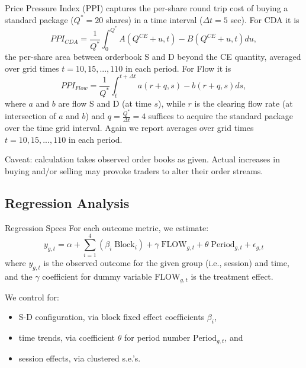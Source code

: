 \documentclass[10pt]{beamer}
\begin{document}
\begin{frame}{Price Pressure Index (PPI)}
captures the per-share round trip  cost of buying a standard package ($Q^*=20$ shares) in a time interval ($\Delta t = 5$ sec). %
For CDA it is
\begin{equation} \label{eq:ppicda}
    PPI_{CDA} = \frac{1}{Q^*}\int_0^{Q^*} A(Q^{CE}+u,t) - B(Q^{CE}+u,t) du,
\end{equation}
the per-share area between orderbook S and D beyond the CE quantity, averaged over grid times $t=10, 15, ... , 110$ in each period. %
For Flow it is
\begin{equation} \label{eq:ppiflow}
    PPI_{Flow} = \frac{1}{Q^*}\int_t^{t+\Delta t} a(r+q,s) - b(r+q,s) ds,
\end{equation}
where $a$ and $b$ are flow S and D (at time $s$), while $r$ is the clearing flow rate (at intersection of $a$ and $b$) and 
$q=\frac{Q^*}{\Delta t}=4$ suffices to acquire the standard package over the time grid interval. Again we report averages over grid times $t=10, 15, ... , 110$ in each period. %

Caveat: calculation takes observed order books as given. Actual increases in buying and/or selling may provoke traders to alter their order streams.
\end{frame}



\subsection{Regression Analysis}

\begin{frame}{Regression Specs}
For each outcome metric, we estimate: 
\begin{equation} \label{eq:reg}
    y_{g,t} = \alpha + \sum^{4}_{i = 1} \left(\beta_i \; \text{Block}_i\right) + \gamma \; \text{FLOW}_{g,t} + \theta \; \text{Period}_{g,t} + \epsilon_{g,t}
\end{equation}
where $y_{g,t}$ is the observed outcome  for the given group (i.e., session) and time, and the $\gamma$ coefficient for dummy variable $\text{FLOW}_{g,t}$ is the treatment effect. %

We control for: 
\begin{itemize}
\item S-D configuration, via  block fixed effect coefficients $\beta_i$,  
\item time trends, via coefficient $\theta$ for period number $\text{Period}_{g,t}$, and
\item session effects, via clustered s.e.'s.
\end{itemize} %
 
\end{frame}
\end{document}
